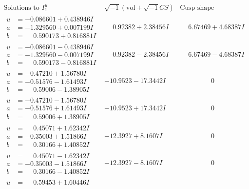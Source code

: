 \documentclass[1p]{elsarticle_modified}
\theoremstyle{definition}
\newcommand{\I}{\sqrt{-1}}
\begin{document}
$$\begin{array}{c|c|c}
\text{Solutions to }I^u_{1}& \I (\text{vol} + \sqrt{-1}CS) & \text{Cusp shape}\\
 \hline 
\begin{aligned}
u &= -0.086601 + 0.438946 I \\
a &= -1.329560 + 0.007199 I \\
b &= \phantom{-}0.590173 + 0.816881 I\end{aligned}
 & \phantom{-}0.92382 + 2.38456 I & \phantom{-}6.67469 + 4.68387 I \\ \hline\begin{aligned}
u &= -0.086601 - 0.438946 I \\
a &= -1.329560 - 0.007199 I \\
b &= \phantom{-}0.590173 - 0.816881 I\end{aligned}
 & \phantom{-}0.92382 - 2.38456 I & \phantom{-}6.67469 - 4.68387 I \\ \hline\begin{aligned}
u &= -0.47210 + 1.56780 I \\
a &= -0.51576 - 1.61493 I \\
b &= \phantom{-}0.59006 - 1.38905 I\end{aligned}
 & -10.9523 - 17.3442 I & \phantom{-0.000000 } 0 \\ \hline\begin{aligned}
u &= -0.47210 - 1.56780 I \\
a &= -0.51576 + 1.61493 I \\
b &= \phantom{-}0.59006 + 1.38905 I\end{aligned}
 & -10.9523 + 17.3442 I & \phantom{-0.000000 } 0 \\ \hline\begin{aligned}
u &= \phantom{-}0.45071 + 1.62342 I \\
a &= -0.35003 + 1.51866 I \\
b &= \phantom{-}0.30166 + 1.40852 I\end{aligned}
 & -12.3927 + 8.1607 I & \phantom{-0.000000 } 0 \\ \hline\begin{aligned}
u &= \phantom{-}0.45071 - 1.62342 I \\
a &= -0.35003 - 1.51866 I \\
b &= \phantom{-}0.30166 - 1.40852 I\end{aligned}
 & -12.3927 - 8.1607 I & \phantom{-0.000000 } 0 \\ \hline\begin{aligned}
u &= \phantom{-}0.59453 + 1.60446 I \\

\end{aligned}
\end{array}$$
\end{document}

